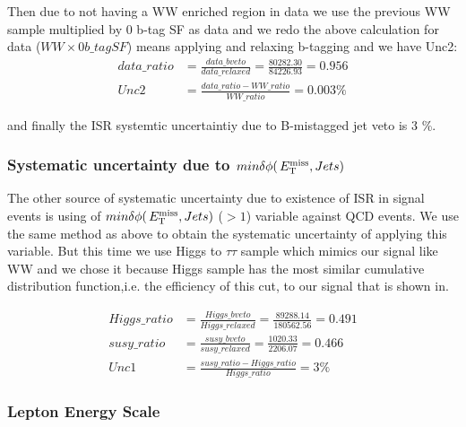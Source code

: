 
Then due to not having a WW enriched region in data we use the previous WW sample multiplied by 0 b-tag SF as data and we redo the above calculation for data ($WW \times 0b\_tag SF$) means applying and relaxing b-tagging and we have Unc2:
\begin{align}
data\_ratio &= \frac{data\_bveto}{data\_relaxed} = \frac{80282.30}{84226.93} = 0.956 \\ \nonumber
Unc2 &= \frac{data\_ratio - WW\_ratio}{WW\_ratio} = 0.003 \%
\end{align}

and finally the ISR systemtic uncertaintiy due to B-mistagged jet veto is 3 \%.

\subsubsection{Systematic uncertainty due to $min\delta \phi (\,{E_{\rm T}^{\rm miss}} , Jets)$}

The other source of systematic uncertainty due to existence of ISR in signal events is using of $min\delta \phi (\,{E_{\rm T}^{\rm miss}} , Jets)$ ($ > 1$) variable against QCD events. We use the same method as above to obtain the systematic uncertainty of applying this variable. But this time we use Higgs to $\tau \tau$ sample which mimics our signal like WW and we chose it because Higgs sample has the most similar cumulative distribution function,i.e. the efficiency of this cut, to our signal that is shown in. %

\begin{align}
Higgs\_ratio &= \frac{Higgs\_bveto}{Higgs\_relaxed} = \frac{89288.14}{180562.56} = 0.491 \\ \nonumber
susy\_ratio &= \frac{susy\_bveto}{susy\_relaxed} = \frac{1020.33}{2206.07} = 0.466 \\ \nonumber
Unc1 &= \frac{susy\_ratio - Higgs\_ratio}{Higgs\_ratio} = 3 \% 
\end{align}


\subsubsection{Lepton Energy Scale}

